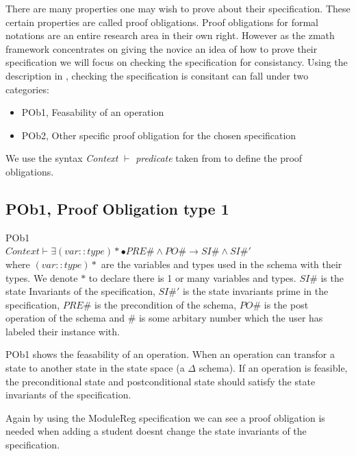 There are many properties one may wish to prove about their specification. These certain properties are called proof obligations. Proof obligations for formal notations are an entire research area in their own right. However as the \gls{zmath} framework concentrates on giving the novice an idea of how to prove their specification we will focus on checking the specification for consistancy. Using the description in \cite{DBLP:conf/icsea/WenMZ06}, checking the specification is consitant can fall under two categories:

\begin{itemize}
\item POb1, Feasability of an operation
\item POb2, Other specific proof obligation for the chosen specification
\end{itemize}

We use the syntax \textit{Context} $\vdash$ \textit{predicate} taken from \cite{DBLP:conf/icsea/WenMZ06} to define the proof obligations.

\subsection{POb1, Proof Obligation type 1}
\label{subsec:pob1}

\begin{defin}\label{defa}POb1\\

$Context \vdash \exists (var::type)* \bullet PRE\# \land PO\# \longrightarrow SI\# \land SI\#'$\\

\noindent where $(var::type)*$ are the variables and types used in the schema with their types. We denote $*$ to declare there is 1 or many variables and types. $SI\#$ is the state Invariants of the specification, $SI\#'$ is the state invariants prime in the specification, $PRE\#$ is the precondition of the schema, $PO\#$ is the post operation of the schema and $\#$ is some arbitary number which the user has labeled their instance with.
\end{defin}

POb1 shows the feasability of an operation. When an operation can transfor a state to another state in the state space (a $\Delta$ schema). If an operation is feasible, the preconditional state and postconditional state should satisfy the state invariants of the specification.

Again by using the ModuleReg specification we can see a proof obligation is needed when adding a student doesnt change the state invariants of the specification.

